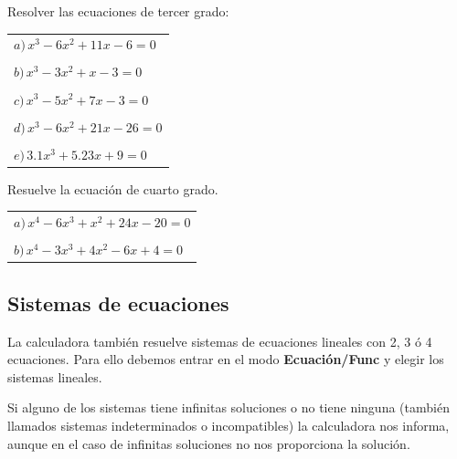 \documentclass[12pt]{article}
\newenvironment{capitulo}{\begin{tcolorbox}[colback=blue!5!white,colframe=red!75!black]}{\end{tcolorbox}\bigskip}
\newenvironment{ejer}{\begin{tcolorbox}[center title, 
fonttitle=\sffamily\bfseries,colback=blue!5,colframe=orange]}{\end{tcolorbox}}
\begin{document}
\begin{ejer} 

Resolver las ecuaciones de tercer grado:

\bigskip

\begin{tabular}{l}
$a)\, x^3-6 x^2+11 x-6=0$\\
 \\
$b)\, x^3-3 x^2+x-3=0$\\
\\
$c)\, x^3-5 x^2+7 x-3=0$ \\
\\
$d)\, x^3-6 x^2+21 x-26=0$\\
\\
$e)\, 3.1x^3+5.23x+9=0$
\end{tabular}

\end{ejer}


\begin{ejer} 

Resuelve la ecuación de cuarto grado.

\bigskip
\begin{tabular}{l }
$a) \, x^4 - 6 x^3 + x^2 + 24 x - 20=0$ \\
\\
$b)\, x^4 - 3 x^3 + 4 x^2 - 6 x + 4=0$
\end{tabular}

\end{ejer}



\newpage

\begin{capitulo}
\section*{Sistemas de ecuaciones}
\end{capitulo}

La calculadora también resuelve sistemas de ecuaciones lineales con 2, 3 ó 4 ecuaciones. Para ello debemos entrar en el modo \textbf{Ecuación/Func} y elegir los sistemas lineales.


Si alguno de los sistemas tiene infinitas soluciones o no tiene ninguna (también llamados sistemas indeterminados o incompatibles) la calculadora nos informa, aunque en el caso de infinitas soluciones no nos proporciona la solución.
\end{document}

